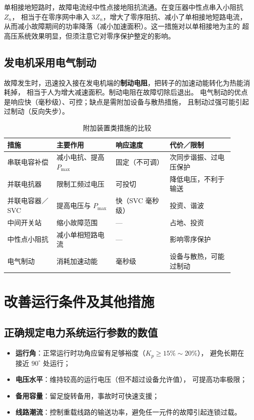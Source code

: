 单相接地短路时，故障电流经中性点接地阻抗流通。在变压器中性点串入小阻抗 $Z_n$，
相当于在零序网中串入 $3Z_n$，增大了零序阻抗、减小了单相接地短路电流，
从而减小故障期间的功率降落（减小加速面积）。这一措施对以单相接地为主的
超高压系统效果明显，但须注意它对零序保护整定的影响。

\subsection{发电机采用电气制动}

故障发生时，迅速投入接在发电机端的\textbf{制动电阻}，把转子的加速动能转化为热能消耗掉，
相当于人为增大减速面积。制动电阻在故障切除后退出。
电气制动的优点是响应快（毫秒级）、可控；缺点是需附加设备与散热措施，
且制动过强可能引起过制动（反向失步）。

\begin{table}[htbp]
  \centering
  \caption{附加装置类措施的比较}
  \small
  \begin{tabular}{@{}p{0.20\linewidth}p{0.24\linewidth}p{0.22\linewidth}p{0.26\linewidth}@{}}
    \toprule
    措施 & 主要作用 & 响应速度 & 代价／限制 \\
    \midrule
    串联电容补偿 & 减小电抗、提高 $P_{\max}$ & 固定（不可调） & 次同步谐振、过电压保护 \\
    并联电抗器 & 限制工频过电压 & 可投切 & 降低电压，不利于输送 \\
    并联电容器／SVC & 提高电压与 $P_{\max}$ & 快（SVC 毫秒级） & 投资、谐波 \\
    中间开关站 & 缩小故障范围 & — & 占地、投资 \\
    中性点小阻抗 & 减小单相短路电流 & — & 影响零序保护 \\
    电气制动 & 消耗加速动能 & 毫秒级 & 设备与散热，可能过制动 \\
    \bottomrule
  \end{tabular}
\end{table}

\section{改善运行条件及其他措施}

\subsection{正确规定电力系统运行参数的数值}

\begin{itemize}
  \item \textbf{运行角}：正常运行时功角应留有足够裕度（$K_p\ge15\%\sim20\%$），
        避免长期在接近 $90^\circ$ 处运行；
  \item \textbf{电压水平}：维持较高的运行电压（但不超过设备允许值），
        可提高功率极限；
  \item \textbf{备用容量}：留足旋转备用，事故时可快速支援；
  \item \textbf{线路潮流}：控制重载线路的输送功率，避免任一元件的故障引起连锁过载。
\end{itemize}

